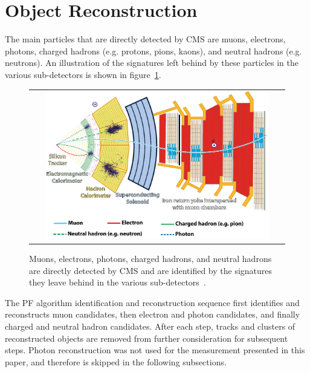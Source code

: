 \section{Object Reconstruction}
The main particles that are directly detected by CMS are muons, electrons, photons, charged hadrons (e.g. protons, pions, kaons), and neutral hadrons (e.g. neutrons).
An illustration of the signatures left behind by these particles in the various sub-detectors is shown in figure~\ref{CMS_Layers}.
\begin{figure}[!htb]
  \begin{center}
    \begin{tabular}{c}
        \includegraphics[width=0.9\textwidth]{fig_LHC_CMS/CMS_Layers.png}
    \end{tabular}
    \caption{Muons, electrons, photons, charged hadrons, and neutral hadrons are directly detected by CMS and are identified by the signatures they leave behind in the various sub-detectors~\cite{Sirunyan:2270046}.
            }
    \label{CMS_Layers}
  \end{center}
\end{figure}
The PF algorithm identification and reconstruction sequence first identifies and reconstructs muon candidates, then electron and photon candidates, and finally charged and neutral hadron candidates.
After each step, tracks and clusters of reconstructed objects are removed from further consideration for subsequent steps.
Photon reconstruction was not used for the measurement presented in this paper, and therefore is skipped in the following subsections.

